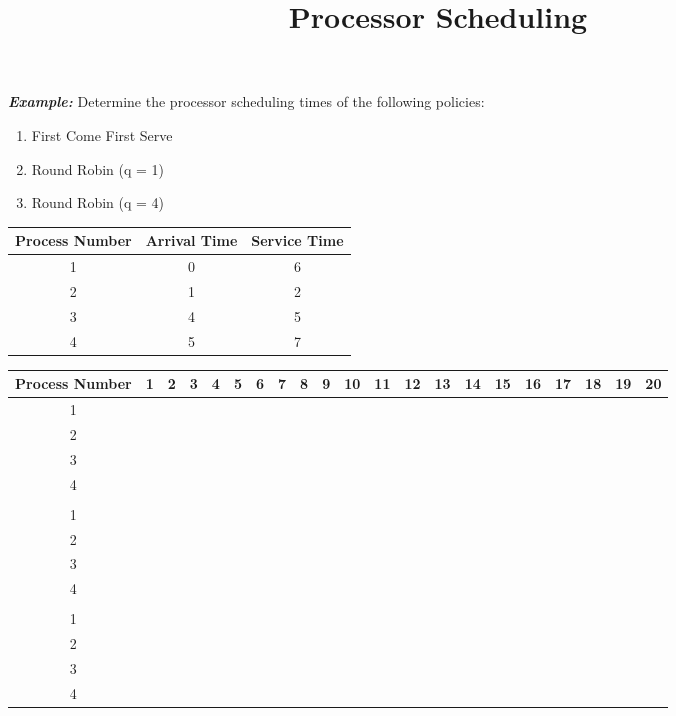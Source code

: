 \documentclass{article}
\title{Processor Scheduling}
\date{}
\newcommand{\generateHeader}{
\hline
Process Number & 1 & 2 & 3 & 4 & 5 & 6 & 7 & 8 & 9 & 10 & 11 & 12 & 13 & 14 & 15 & 16 & 17 & 18 & 19 & 20\\
\hline
}
\newcommand{\bc}{\cellcolor{blue!60}}
\newcommand{\blackc}{\cellcolor{black!}}
\newcommand{\blackrow}{
\blackc & \blackc & \blackc & \blackc & \blackc & \blackc & \blackc & \blackc & \blackc & \blackc & \blackc & \blackc & \blackc & \blackc & \blackc & \blackc & \blackc & \blackc & \blackc & \blackc & \blackc\\
\hline
}
\newcommand{\Example}{\textit{\textbf{Example: }}}
\begin{document}
\maketitle
\Example Determine the processor scheduling times of the following policies:
\begin{enumerate}
\item First Come First Serve
\item Round Robin (q = 1)
\item Round Robin (q = 4)
\end{enumerate}
\begin{center}
\begin{tabular}{|c|c|c|}
\hline
Process Number & Arrival Time & Service Time\\
\hline
1 & 0 & 6\\
\hline
2 & 1 & 2\\
\hline
3 & 4 & 5\\
\hline
4 & 5 & 7\\
\hline
\end{tabular}

\vspace{1cm}

\begin{tabular}{|c|c|c|c|c|c|c|c|c|c|c|c|c|c|c|c|c|c|c|c|c|}
\generateHeader
1	&\bc	&\bc	&\bc	&\bc	&\bc	&\bc	&	&	&	&	&	&	&	&	&	&	&	&	&	&\\
\hline
2	&	&	&	&	&	&	&\bc &\bc &	&	&	&	&	&	&	&	&	&	&	&\\
\hline
3 	& 	& 	&	&	&	&	&	&	&\bc &\bc &\bc & \bc &\bc &	&	&	&	&	&	&\\
\hline
4	&	&	&	&	&	&	&	&	&	&	&	&	&	&\bc &\bc &\bc &\bc	&\bc	&\bc	&\bc\\
\hline
\blackrow
1	&\bc	&	&\bc	&	&\bc	&	&	&\bc	&	&	&\bc	&	&	&\bc	&	&	&	&	&	&\\
\hline
2	&	&\bc	&	&\bc	&	&	&	&	&	&	&	&	&	&	&	&	&	&	&	&\\
\hline
3	&	&	&	&	&	&\bc	&	&	&\bc	&	&	&\bc	&	&	&\bc	&	&\bc	&	&	&\\
\hline
4	&	&	&	&	&	&	&\bc	&	&	&\bc	&	&	&\bc	&	&	&\bc	&	&\bc	&\bc	&\bc\\
\hline
\blackrow
1	&\bc	&\bc	&\bc	&\bc	&	&	&	&	&	&	&\bc	&\bc	&	&	&	&	&	&	&	&\\
\hline
2	&	&	&	&	&\bc	&\bc	&	&	&	&	&	&	&	&	&	&	&	&	&	&\\
\hline
3	&	&	&	&	&	&	&\bc	&\bc	&\bc	&\bc	&	&	&	&	&	&	&\bc	&	&	&\\
\hline
4	&	&	&	&	&	&	&	&	&	&	&	&	&\bc	&\bc	&\bc	&\bc	&	&\bc	&\bc	&\bc\\
\hline
\end{tabular}
\end{center}
\newpage
\end{document}
